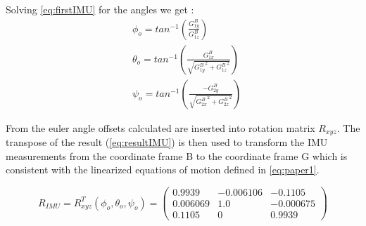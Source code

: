 Solving \cref{eq:firstIMU} for the angles we get :
\begin{align}
   & \phi_o=tan^{-1}\left(\frac{G_{1y}^B}{G_{1z}^B}\right)
   \label{eq:offset1}
   \\
   & \theta_o= tan^{-1}\left(\frac{G_{1 x}^B}{\sqrt{{G_{1 y}^B}^{2}+{G_{1 z}^B}^{2}}}\right) 
   \label{eq:offset2}
   \\
   & \psi_o = tan^{-1}\left(\frac{-G_{2 y}^B}{\sqrt{{G_{2 x}^B}^{2}+{G_{2 z}^B}^{2}}}\right)
   \label{eq:offset3}
\end{align}

From  the euler angle offsets calculated are inserted into rotation matrix \ensuremath{R_{\mathit{xyz}}}. The transpose of the result (\ref{eq:resultIMU}) is then used to transform the IMU measurements from the coordinate frame B to the coordinate frame G which is consistent with the linearized equations of motion defined in \cref{eq:paper1}.

\begin{equation}
R_{\mathit{IMU}}=R_{\mathit{xyz}}^T(\phi_o,\theta_o,\psi_o)=\left(\begin{array}{ccc} 0.9939 & -0.006106 & -0.1105\\ 0.006069 & 1.0 & -0.000675\\ 0.1105 & 0 & 0.9939 \end{array}\right)
    \label{eq:resultIMU}
\end{equation} 